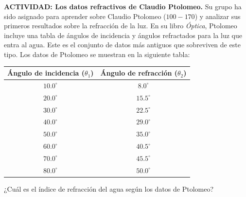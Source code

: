 \item \textbf{ACTIVIDAD: Los datos refractivos de Claudio Ptolomeo.}
Su grupo ha sido asignado para aprender sobre Claudio Ptolomeo ($100-170$) y analizar sus primeros resultados sobre la refracción de la luz. En su libro \textit{Óptica}, Ptolomeo incluye una tabla de ángulos de incidencia y ángulos refractados para la luz que entra al agua. Este es el conjunto de datos más antiguos que sobreviven de este tipo. Los datos de Ptolomeo se muestran en la siguiente tabla:

\begin{center}
\begin{tabular}{|c|c|}
\hline
\textbf{Ángulo de incidencia ($\theta_1$)} & \textbf{Ángulo de refracción ($\theta_2$)} \\ \hline
$10.0^\circ$ & $8.0^\circ$ \\ \hline
$20.0^\circ$ & $15.5^\circ$ \\ \hline
$30.0^\circ$ & $22.5^\circ$ \\ \hline
$40.0^\circ$ & $29.0^\circ$ \\ \hline
$50.0^\circ$ & $35.0^\circ$ \\ \hline
$60.0^\circ$ & $40.5^\circ$ \\ \hline
$70.0^\circ$ & $45.5^\circ$ \\ \hline
$80.0^\circ$ & $50.0^\circ$ \\ \hline
\end{tabular}
\end{center}

¿Cuál es el índice de refracción del agua según los datos de Ptolomeo?